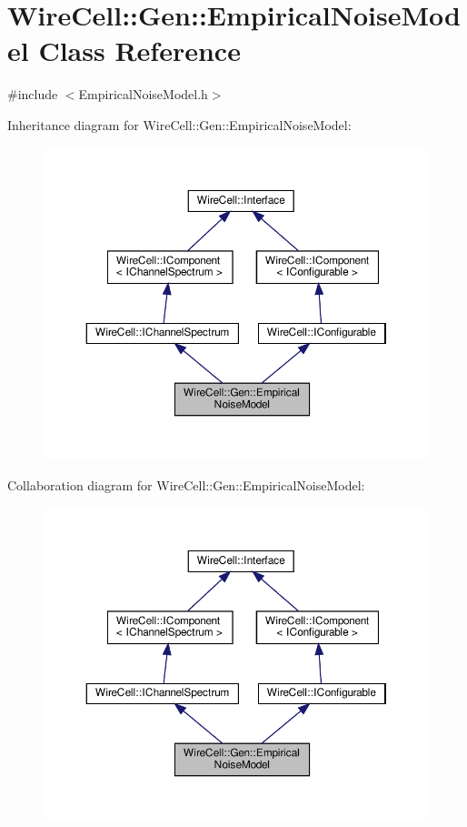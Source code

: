 \hypertarget{class_wire_cell_1_1_gen_1_1_empirical_noise_model}{}\section{Wire\+Cell\+:\+:Gen\+:\+:Empirical\+Noise\+Model Class Reference}
\label{class_wire_cell_1_1_gen_1_1_empirical_noise_model}


{\ttfamily \#include $<$Empirical\+Noise\+Model.\+h$>$}



Inheritance diagram for Wire\+Cell\+:\+:Gen\+:\+:Empirical\+Noise\+Model\+:
\nopagebreak
\begin{figure}[H]
\begin{center}
\leavevmode
\includegraphics[width=350pt]{class_wire_cell_1_1_gen_1_1_empirical_noise_model__inherit__graph}
\end{center}
\end{figure}


Collaboration diagram for Wire\+Cell\+:\+:Gen\+:\+:Empirical\+Noise\+Model\+:
\nopagebreak
\begin{figure}[H]
\begin{center}
\leavevmode
\includegraphics[width=350pt]{class_wire_cell_1_1_gen_1_1_empirical_noise_model__coll__graph}
\end{center}
\end{figure}
